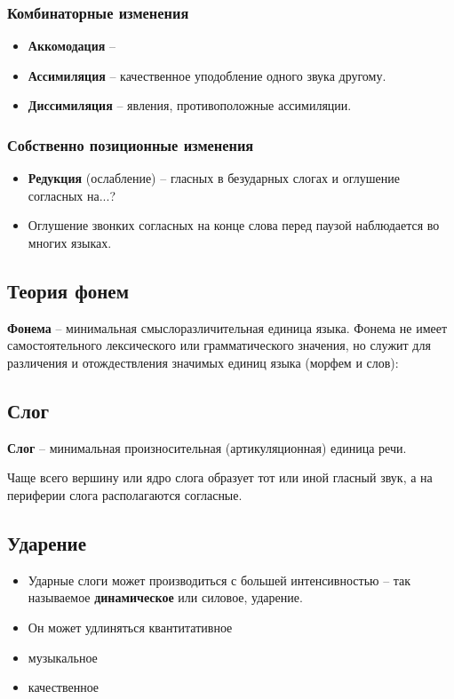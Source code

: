 \documentclass{article}
\begin{document}
\subsubsection{Комбинаторные изменения}
\begin{itemize}
    \item \textbf{Аккомодация} -- 
    \item \textbf{Ассимиляция} -- качественное уподобление одного звука другому.
    \item \textbf{Диссимиляция} -- явления, противоположные ассимиляции.
\end{itemize}

\subsubsection{Собственно позиционные изменения}
\begin{itemize}
    \item \textbf{Редукция} (ослабление) -- гласных в безударных слогах и 
    оглушение согласных на...?
    \item Оглушение звонких согласных на конце слова перед паузой 
    наблюдается во многих языках.
\end{itemize}

\subsection{Теория фонем}
\textbf{Фонема} -- минимальная смыслоразличительная единица языка. 
Фонема не имеет самостоятельного лексического или грамматического значения,
но служит для различения и отождествления значимых единиц языка (морфем и слов):

\subsection{Слог}
\textbf{Слог} -- минимальная произносительная (артикуляционная) единица речи.

Чаще всего вершину или ядро слога образует тот или иной гласный звук, а на периферии
слога располагаются согласные.

\subsection{Ударение}
\begin{itemize}
    \item Ударные слоги может производиться с большей интенсивностью -- 
    так называемое \textbf{динамическое} или силовое, ударение.
    \item Он может удлиняться квантитативное
    \item музыкальное
    \item качественное
\end{itemize}
\end{document}
